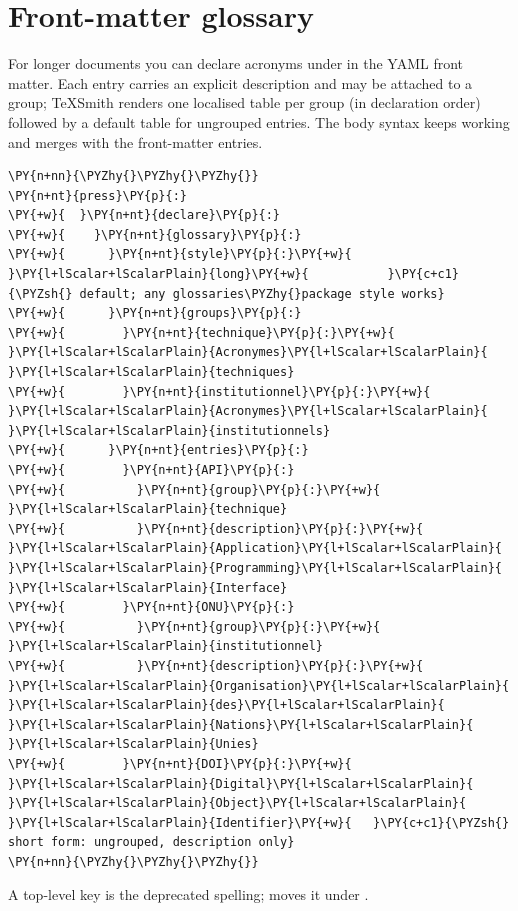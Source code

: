 \documentclass[a4paper,twoside]{article}
\begin{document}
\section{Front-matter glossary}
For longer documents you can declare acronyms under  in
the YAML front matter. Each entry carries an explicit description and may be
attached to a group; TeXSmith renders one localised  table per
group (in declaration order) followed by a default table for ungrouped entries.
The  body syntax keeps working and merges with the front-matter
entries.
\begin{tscode}[lang=yaml, engine=pygments]
\begin{Verbatim}[commandchars=\\\{\},breaklines, breakanywhere, commandchars=\\\{\}]
\PY{n+nn}{\PYZhy{}\PYZhy{}\PYZhy{}}
\PY{n+nt}{press}\PY{p}{:}
\PY{+w}{  }\PY{n+nt}{declare}\PY{p}{:}
\PY{+w}{    }\PY{n+nt}{glossary}\PY{p}{:}
\PY{+w}{      }\PY{n+nt}{style}\PY{p}{:}\PY{+w}{ }\PY{l+lScalar+lScalarPlain}{long}\PY{+w}{           }\PY{c+c1}{\PYZsh{} default; any glossaries\PYZhy{}package style works}
\PY{+w}{      }\PY{n+nt}{groups}\PY{p}{:}
\PY{+w}{        }\PY{n+nt}{technique}\PY{p}{:}\PY{+w}{ }\PY{l+lScalar+lScalarPlain}{Acronymes}\PY{l+lScalar+lScalarPlain}{ }\PY{l+lScalar+lScalarPlain}{techniques}
\PY{+w}{        }\PY{n+nt}{institutionnel}\PY{p}{:}\PY{+w}{ }\PY{l+lScalar+lScalarPlain}{Acronymes}\PY{l+lScalar+lScalarPlain}{ }\PY{l+lScalar+lScalarPlain}{institutionnels}
\PY{+w}{      }\PY{n+nt}{entries}\PY{p}{:}
\PY{+w}{        }\PY{n+nt}{API}\PY{p}{:}
\PY{+w}{          }\PY{n+nt}{group}\PY{p}{:}\PY{+w}{ }\PY{l+lScalar+lScalarPlain}{technique}
\PY{+w}{          }\PY{n+nt}{description}\PY{p}{:}\PY{+w}{ }\PY{l+lScalar+lScalarPlain}{Application}\PY{l+lScalar+lScalarPlain}{ }\PY{l+lScalar+lScalarPlain}{Programming}\PY{l+lScalar+lScalarPlain}{ }\PY{l+lScalar+lScalarPlain}{Interface}
\PY{+w}{        }\PY{n+nt}{ONU}\PY{p}{:}
\PY{+w}{          }\PY{n+nt}{group}\PY{p}{:}\PY{+w}{ }\PY{l+lScalar+lScalarPlain}{institutionnel}
\PY{+w}{          }\PY{n+nt}{description}\PY{p}{:}\PY{+w}{ }\PY{l+lScalar+lScalarPlain}{Organisation}\PY{l+lScalar+lScalarPlain}{ }\PY{l+lScalar+lScalarPlain}{des}\PY{l+lScalar+lScalarPlain}{ }\PY{l+lScalar+lScalarPlain}{Nations}\PY{l+lScalar+lScalarPlain}{ }\PY{l+lScalar+lScalarPlain}{Unies}
\PY{+w}{        }\PY{n+nt}{DOI}\PY{p}{:}\PY{+w}{ }\PY{l+lScalar+lScalarPlain}{Digital}\PY{l+lScalar+lScalarPlain}{ }\PY{l+lScalar+lScalarPlain}{Object}\PY{l+lScalar+lScalarPlain}{ }\PY{l+lScalar+lScalarPlain}{Identifier}\PY{+w}{   }\PY{c+c1}{\PYZsh{} short form: ungrouped, description only}
\PY{n+nn}{\PYZhy{}\PYZhy{}\PYZhy{}}
\end{Verbatim}
\end{tscode}
A top-level  key is the deprecated spelling; 
moves it under .
\end{document}

